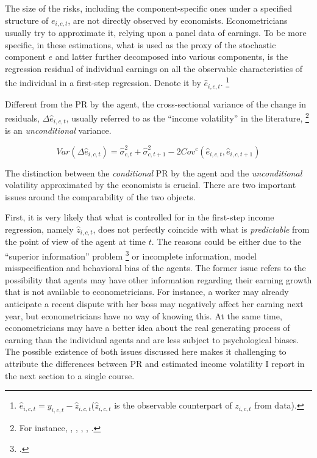 The size of the risks, including the component-specific ones under a specified structure of $e_{i,c,t}$, are not directly observed by economists. Econometricians 
usually try to approximate it, relying upon a panel data of earnings. To be more specific, in these estimations, what is used as the proxy of the stochastic component $e$ and latter further decomposed into various components, is the regression residual of individual earnings on all the observable characteristics of the individual in a first-step regression. Denote it by $\hat e_{i,c,t}$. \footnote{$\hat e_{i,c,t}= y_{i,c,t}-\hat z_{i,c,t}$($\hat z_{i,c,t}$ is the
observable counterpart of $z_{i,c,t}$ from data).} 

Different from the PR by the agent, the cross-sectional variance of the change in residuals, $\Delta \hat e_{i,c,t}$, usually referred to as the ``income volatility'' in the literature, \footnote{For instance, \cite{gottschalk1994growth}, \cite{moffitt2002trends}, \cite{sabelhaus2010great}, \cite{dynan2012evolution}, \cite{bloom2018great}.} is an  \emph{unconditional} variance. 

\begin{equation}
Var(\Delta \hat e_{i,c,t}) = \hat\sigma^2_{c,t}+ \hat\sigma^2_{c,t+1} - 2Cov^c(\hat e_{i,c,t},\hat e_{i,c,t+1})
\end{equation}


The distinction between the \emph{conditional} PR by the agent and the \emph{unconditional} volatility approximated by the economists is crucial. There are two important issues around the comparability of the two objects. 

First, it is very likely that what is controlled for in the first-step income regression, namely $\hat z_{i,c,t}$, does not perfectly coincide with what is \emph{predictable} from the point of view of the agent at time $t$. The reasons could be either due to the ``superior information'' problem \footnote{\cite{pistaferri_superior_2001, kaufmann_disentangling_2009}.} or incomplete information, model misspecification and behavioral bias of the agents. The former issue refers to the possibility that agents may have other information regarding their earning growth that is not available to econometricians. For instance, a worker may already anticipate a recent dispute with her boss may negatively affect her earning next year, but econometricians have no way of knowing this. At the same time, econometricians may have a better idea about the real generating process of earning than the individual agents and are less subject to psychological biases. 
The possible existence of both issues discussed here makes it challenging to attribute the differences between PR and estimated income volatility I report in the next section to a single course. 


